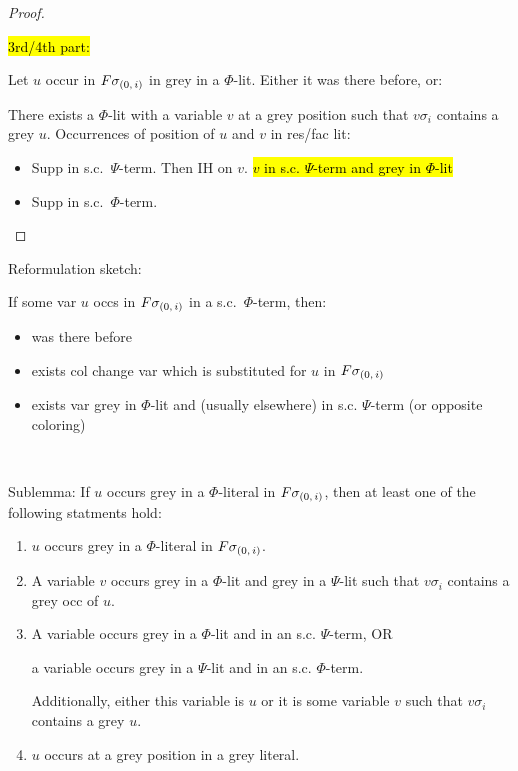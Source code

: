 \documentclass[,%
	draft=false,%
	numbers=noendperiod
	12pt,
	a4paper,
	oneside,%
	openany,
]{memoir}
\begin{document}
{\begin{proof}
	~

	\hl{3rd/4th part:} 

	Let $u$ occur in $F\sigma_{(0,\,i)}$ in grey in a $\Phi$-lit. 
	Either it was there before, or:

	There exists a $\Phi$-lit with a variable $v$ at a grey position such that $v\sigma_i$ contains a grey $u$.
	Occurrences of position of $u$ and $v$ in res/fac lit:

	\begin{itemize}
		\item Supp in s.c.\ $\Psi$-term. Then IH on $v$. \hl{$v$ in s.c. $\Psi$-term and grey in $\Phi$-lit}
		\item Supp in s.c.\ $\Phi$-term. 
	\end{itemize}

\end{proof}

Reformulation sketch:

If some var $u$ occs in $F\sigma_{(0,\,i)}$ in a s.c.\ $\Phi$-term, then:
\begin{itemize}
	\item was there before
	\item exists col change var which is substituted for $u$ in $F\sigma_{(0,\,i)}$
	\item exists var grey in $\Phi$-lit and (usually elsewhere) in s.c. $\Psi$-term (or opposite coloring)
\end{itemize}

~

\noindent
Sublemma: If $u$ occurs grey in a $\Phi$-literal in $F\sigma_{(0,\,i)}$, then at least one of the following statments hold:
\begin{enumerate}
	\item $u$ occurs grey in a $\Phi$-literal in $F\sigma_{(0,\,i)}$.
		\label{14_1}

	\item 
		\label{14_2}
		A variable $v$ occurs grey in a $\Phi$-lit and grey in a $\Psi$-lit such that $v\sigma_i$ contains a grey occ of $u$.

	\item 
		\label{14_3}
		A variable occurs grey in a $\Phi$-lit and in an s.c. $\Psi$-term, OR

		a variable occurs grey in a $\Psi$-lit and in an s.c. $\Phi$-term.

		Additionally, either this variable is $u$ or it is some variable $v$ such that $v\sigma_i$ contains a grey $u$.

	\item
		\label{14_4}
		$u$ occurs at a grey position in a grey literal.


\end{enumerate}}
\end{document}
